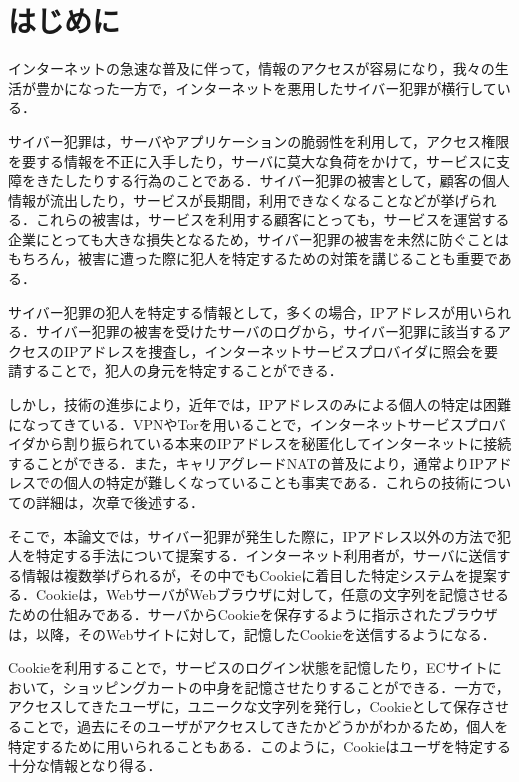 \documentclass[10pt, a4paper]{jreport}
\begin{document}


\chapter{はじめに}
インターネットの急速な普及に伴って，情報のアクセスが容易になり，我々の生活が豊かになった一方で，インターネットを悪用したサイバー犯罪が横行している．

サイバー犯罪は，サーバやアプリケーションの脆弱性を利用して，アクセス権限を要する情報を不正に入手したり，サーバに莫大な負荷をかけて，サービスに支障をきたしたりする行為のことである．サイバー犯罪の被害として，顧客の個人情報が流出したり，サービスが長期間，利用できなくなることなどが挙げられる．これらの被害は，サービスを利用する顧客にとっても，サービスを運営する企業にとっても大きな損失となるため，サイバー犯罪の被害を未然に防ぐことはもちろん，被害に遭った際に犯人を特定するための対策を講じることも重要である．

サイバー犯罪の犯人を特定する情報として，多くの場合，IPアドレスが用いられる．サイバー犯罪の被害を受けたサーバのログから，サイバー犯罪に該当するアクセスのIPアドレスを捜査し，インターネットサービスプロバイダに照会を要請することで，犯人の身元を特定することができる．

しかし，技術の進歩により，近年では，IPアドレスのみによる個人の特定は困難になってきている．VPNやTorを用いることで，インターネットサービスプロバイダから割り振られている本来のIPアドレスを秘匿化してインターネットに接続することができる．また，キャリアグレードNATの普及により，通常よりIPアドレスでの個人の特定が難しくなっていることも事実である．これらの技術についての詳細は，次章で後述する．

そこで，本論文では，サイバー犯罪が発生した際に，IPアドレス以外の方法で犯人を特定する手法について提案する．インターネット利用者が，サーバに送信する情報は複数挙げられるが，その中でもCookieに着目した特定システムを提案する．Cookieは，WebサーバがWebブラウザに対して，任意の文字列を記憶させるための仕組みである．サーバからCookieを保存するように指示されたブラウザは，以降，そのWebサイトに対して，記憶したCookieを送信するようになる．

Cookieを利用することで，サービスのログイン状態を記憶したり，ECサイトにおいて，ショッピングカートの中身を記憶させたりすることができる．一方で，アクセスしてきたユーザに，ユニークな文字列を発行し，Cookieとして保存させることで，過去にそのユーザがアクセスしてきたかどうかがわかるため，個人を特定するために用いられることもある．このように，Cookieはユーザを特定する十分な情報となり得る．
\end{document}
